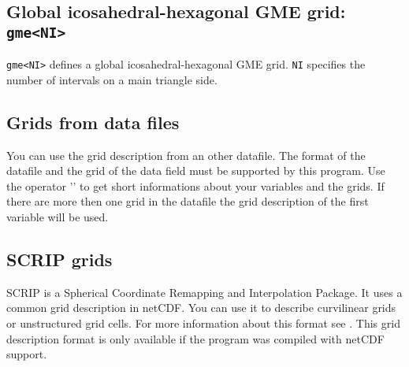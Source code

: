 
\subsection*{Global icosahedral-hexagonal GME grid: {\tt gme<NI>}}
    {\tt gme<NI>} defines a global icosahedral-hexagonal GME grid.
    {\tt NI} specifies the number of intervals on a main triangle side.

\subsection{Grids from data files}

You can use the grid description from an other datafile.
The format of the datafile and the grid of the data field must
be supported by this program.
Use the operator '' to get short informations about
your variables and the grids.
If there are more then one grid in the datafile the grid description of
the first variable will be used.

\subsection{SCRIP grids}

SCRIP is a Spherical Coordinate Remapping and Interpolation Package.
It uses a common grid description in netCDF.
You can use it to describe curvilinear grids or unstructured grid cells.
For more information about this format see \cite{SCRIP}.
This grid description format is only available if the program was compiled
with netCDF support.

\vspace{2mm}

